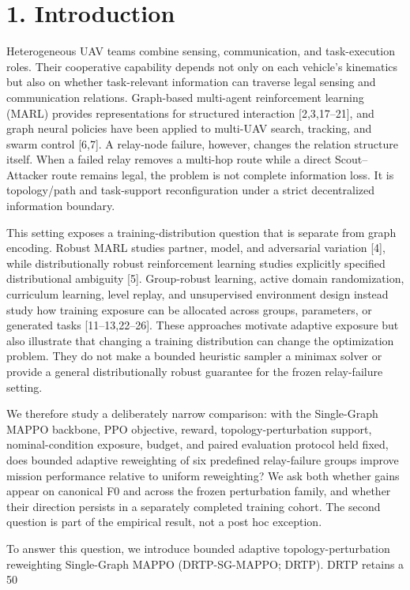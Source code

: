 \section{1. Introduction}

Heterogeneous UAV teams combine sensing, communication, and task-execution roles. Their cooperative capability depends not only on each vehicle's kinematics but also on whether task-relevant information can traverse legal sensing and communication relations. Graph-based multi-agent reinforcement learning (MARL) provides representations for structured interaction [2,3,17--21], and graph neural policies have been applied to multi-UAV search, tracking, and swarm control [6,7]. A relay-node failure, however, changes the relation structure itself. When a failed relay removes a multi-hop route while a direct Scout--Attacker route remains legal, the problem is not complete information loss. It is topology/path and task-support reconfiguration under a strict decentralized information boundary.

This setting exposes a training-distribution question that is separate from graph encoding. Robust MARL studies partner, model, and adversarial variation [4], while distributionally robust reinforcement learning studies explicitly specified distributional ambiguity [5]. Group-robust learning, active domain randomization, curriculum learning, level replay, and unsupervised environment design instead study how training exposure can be allocated across groups, parameters, or generated tasks [11--13,22--26]. These approaches motivate adaptive exposure but also illustrate that changing a training distribution can change the optimization problem. They do not make a bounded heuristic sampler a minimax solver or provide a general distributionally robust guarantee for the frozen relay-failure setting.

We therefore study a deliberately narrow comparison: with the Single-Graph MAPPO backbone, PPO objective, reward, topology-perturbation support, nominal-condition exposure, budget, and paired evaluation protocol held fixed, does bounded adaptive reweighting of six predefined relay-failure groups improve mission performance relative to uniform reweighting? We ask both whether gains appear on canonical F0 and across the frozen perturbation family, and whether their direction persists in a separately completed training cohort. The second question is part of the empirical result, not a post hoc exception.

To answer this question, we introduce bounded adaptive topology-perturbation reweighting Single-Graph MAPPO (DRTP-SG-MAPPO; DRTP). DRTP retains a 50%

